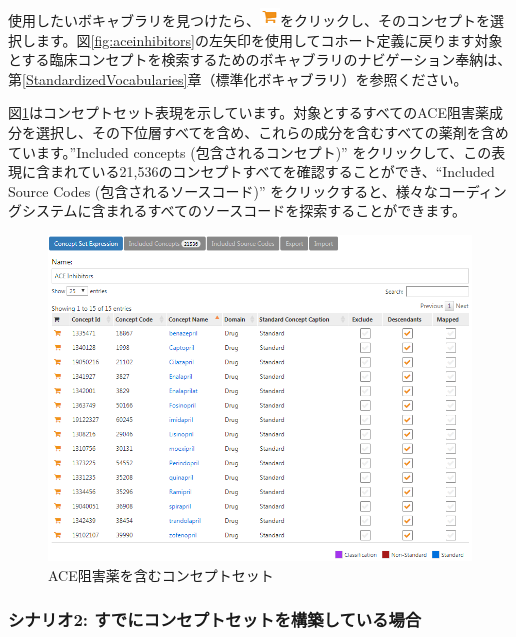 \documentclass[
  11pt]{book}
\theoremstyle{definition}
\theoremstyle{definition}
\theoremstyle{definition}
\theoremstyle{definition}
\theoremstyle{remark}
\begin{document}
使用したいボキャブラリを見つけたら、\includegraphics{images/Cohorts/shoppingcart.png}をクリックし、そのコンセプトを選択します。図\ref{fig:aceinhibitors}の左矢印を使用してコホート定義に戻ります対象とする臨床コンセプトを検索するためのボキャブラリのナビゲーション奉納は、第\ref{StandardizedVocabularies}章（標準化ボキャブラリ）を参照ください。

図\ref{fig:aceConceptSetExpression}はコンセプトセット表現を示しています。対象とするすべてのACE阻害薬成分を選択し、その下位層すべてを含め、これらの成分を含むすべての薬剤を含めています。''Included concepts (包含されるコンセプト)'' をクリックして、この表現に含まれている21,536のコンセプトすべてを確認することができ、``Included Source Codes (包含されるソースコード)'' をクリックすると、様々なコーディングシステムに含まれるすべてのソースコードを探索することができます。

\begin{figure}

{\centering \includegraphics[width=1\linewidth]{images/Cohorts/aceConceptSetExpression} 

}

\caption{ACE阻害薬を含むコンセプトセット}\label{fig:aceConceptSetExpression}
\end{figure}

\subsubsection*{シナリオ2: すでにコンセプトセットを構築している場合}\label{ux30b7ux30caux30eaux30aa2-ux3059ux3067ux306bux30b3ux30f3ux30bbux30d7ux30c8ux30bbux30c3ux30c8ux3092ux69cbux7bc9ux3057ux3066ux3044ux308bux5834ux5408}
\end{document}
